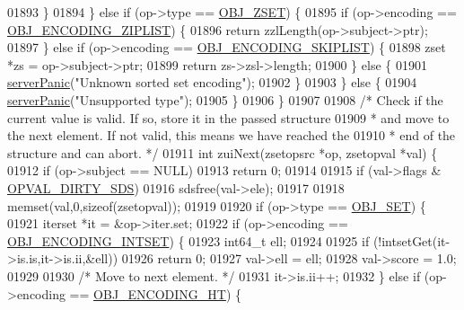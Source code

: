 \begin{DoxyCode}
01893         \}
01894     \} \textcolor{keywordflow}{else} \textcolor{keywordflow}{if} (op->type == \hyperlink{server_8h_a8c356422ddbc03bd77694880a30a1953}{OBJ\_ZSET}) \{
01895         \textcolor{keywordflow}{if} (op->encoding == \hyperlink{server_8h_aabf064ede983103f1fd0df2086e84eee}{OBJ\_ENCODING\_ZIPLIST}) \{
01896             \textcolor{keywordflow}{return} zzlLength(op->subject->ptr);
01897         \} \textcolor{keywordflow}{else} \textcolor{keywordflow}{if} (op->encoding == \hyperlink{server_8h_acfb35db5cb30ed113ed23aeb1a224c4c}{OBJ\_ENCODING\_SKIPLIST}) \{
01898             zset *zs = op->subject->ptr;
01899             \textcolor{keywordflow}{return} zs->zsl->length;
01900         \} \textcolor{keywordflow}{else} \{
01901             \hyperlink{server_8h_a11cc378e7778a830b41240578de3b204}{serverPanic}(\textcolor{stringliteral}{"Unknown sorted set encoding"});
01902         \}
01903     \} \textcolor{keywordflow}{else} \{
01904         \hyperlink{server_8h_a11cc378e7778a830b41240578de3b204}{serverPanic}(\textcolor{stringliteral}{"Unsupported type"});
01905     \}
01906 \}
01907 
01908 \textcolor{comment}{/* Check if the current value is valid. If so, store it in the passed structure}
01909 \textcolor{comment}{ * and move to the next element. If not valid, this means we have reached the}
01910 \textcolor{comment}{ * end of the structure and can abort. */}
01911 \textcolor{keywordtype}{int} zuiNext(zsetopsrc *op, zsetopval *val) \{
01912     \textcolor{keywordflow}{if} (op->subject == NULL)
01913         \textcolor{keywordflow}{return} 0;
01914 
01915     \textcolor{keywordflow}{if} (val->flags & \hyperlink{t__zset_8c_acbe2b593dce5dd6c6d7219e6be208e5f}{OPVAL\_DIRTY\_SDS})
01916         sdsfree(val->ele);
01917 
01918     memset(val,0,\textcolor{keyword}{sizeof}(zsetopval));
01919 
01920     \textcolor{keywordflow}{if} (op->type == \hyperlink{server_8h_a8d179375a4aac33d3fa7aa80c8ccc75f}{OBJ\_SET}) \{
01921         iterset *it = &op->iter.set;
01922         \textcolor{keywordflow}{if} (op->encoding == \hyperlink{server_8h_a214173987de21c3b7661fddd42b05873}{OBJ\_ENCODING\_INTSET}) \{
01923             int64\_t ell;
01924 
01925             \textcolor{keywordflow}{if} (!intsetGet(it->is.is,it->is.ii,&ell))
01926                 \textcolor{keywordflow}{return} 0;
01927             val->ell = ell;
01928             val->score = 1.0;
01929 
01930             \textcolor{comment}{/* Move to next element. */}
01931             it->is.ii++;
01932         \} \textcolor{keywordflow}{else} \textcolor{keywordflow}{if} (op->encoding == \hyperlink{server_8h_a9c10219f68afc557d510d108257d238b}{OBJ\_ENCODING\_HT}) \{

\end{DoxyCode}
